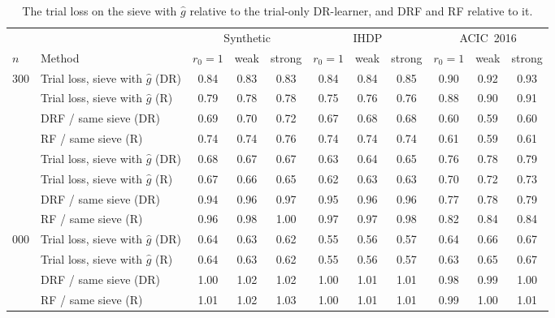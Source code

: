 \begin{table}[h]
\caption{The trial loss on the sieve with $\hat g$ relative to the trial-only DR-learner, and DRF and RF relative to it.}
\label{tab:samesieve}
\begin{center}\footnotesize
\begin{tabular}{@{}llccccccccc@{}}
\toprule
& & \multicolumn{3}{c}{Synthetic} & \multicolumn{3}{c}{IHDP} & \multicolumn{3}{c}{ACIC~2016}\\
\cmidrule(lr){3-5}\cmidrule(lr){6-8}\cmidrule(lr){9-11}
$n$ & Method & $r_0{=}1$ & weak & strong & $r_0{=}1$ & weak & strong & $r_0{=}1$ & weak & strong\\
\midrule
300 & Trial loss, sieve with $\hat g$ (DR) & 0.84 & 0.83 & 0.83 & 0.84 & 0.84 & 0.85 & 0.90 & 0.92 & 0.93 \\
 & Trial loss, sieve with $\hat g$ (R) & 0.79 & 0.78 & 0.78 & 0.75 & 0.76 & 0.76 & 0.88 & 0.90 & 0.91 \\
 & DRF / same sieve (DR) & 0.69 & 0.70 & 0.72 & 0.67 & 0.68 & 0.68 & 0.60 & 0.59 & 0.60 \\
 & RF / same sieve (R) & 0.74 & 0.74 & 0.76 & 0.74 & 0.74 & 0.74 & 0.61 & 0.59 & 0.61 \\
\addlinespace
900 & Trial loss, sieve with $\hat g$ (DR) & 0.68 & 0.67 & 0.67 & 0.63 & 0.64 & 0.65 & 0.76 & 0.78 & 0.79 \\
 & Trial loss, sieve with $\hat g$ (R) & 0.67 & 0.66 & 0.65 & 0.62 & 0.63 & 0.63 & 0.70 & 0.72 & 0.73 \\
 & DRF / same sieve (DR) & 0.94 & 0.96 & 0.97 & 0.95 & 0.96 & 0.96 & 0.77 & 0.78 & 0.79 \\
 & RF / same sieve (R) & 0.96 & 0.98 & 1.00 & 0.97 & 0.97 & 0.98 & 0.82 & 0.84 & 0.84 \\
\addlinespace
3{,}000 & Trial loss, sieve with $\hat g$ (DR) & 0.64 & 0.63 & 0.62 & 0.55 & 0.56 & 0.57 & 0.64 & 0.66 & 0.67 \\
 & Trial loss, sieve with $\hat g$ (R) & 0.64 & 0.63 & 0.62 & 0.55 & 0.56 & 0.57 & 0.63 & 0.65 & 0.67 \\
 & DRF / same sieve (DR) & 1.00 & 1.02 & 1.02 & 1.00 & 1.01 & 1.01 & 0.98 & 0.99 & 1.00 \\
 & RF / same sieve (R) & 1.01 & 1.02 & 1.03 & 1.00 & 1.01 & 1.01 & 0.99 & 1.00 & 1.01 \\
\bottomrule
\end{tabular}
\end{center}
\end{table}
